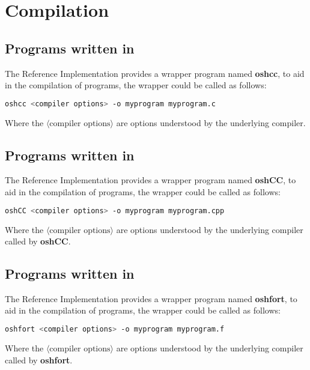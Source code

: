 \section{Compilation}
\subsection*{Programs written in \Cstd}

The \openshmem{} Reference Implementation provides a wrapper program named
\textbf{oshcc}, to aid in the compilation of \Cstd programs, the wrapper
could be called as follows:

\begin{lstlisting}[language=bash]
oshcc <compiler options> -o myprogram myprogram.c
\end{lstlisting}
Where the $\langle\mbox{compiler options}\rangle$ are options understood by the
underlying \Cstd compiler.


\subsection*{Programs written in \Cpp}

The  \openshmem{} Reference Implementation provides a wrapper program named
\textbf{oshCC}, to aid in the compilation of \Cpp programs, the wrapper could
be called as follows:

\begin{lstlisting}[language=bash]
oshCC <compiler options> -o myprogram myprogram.cpp
\end{lstlisting}
Where the $\langle\mbox{compiler options}\rangle$ are options understood by the
underlying \Cpp compiler called by \textbf{oshCC}.


\subsection*{Programs written in \Fortran}

The  \openshmem{} Reference Implementation provides a wrapper program named
\textbf{oshfort}, to aid in the compilation of \Fortran programs, the wrapper
could be called as follows:

\begin{lstlisting}[language=bash]
oshfort <compiler options> -o myprogram myprogram.f
\end{lstlisting}
Where the $\langle\mbox{compiler options}\rangle$ are options understood by the
underlying \Fortran compiler called by \textbf{oshfort}.

